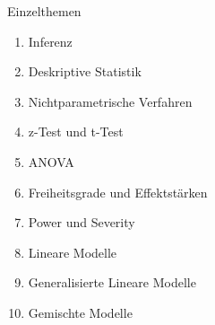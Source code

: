   \begin{frame}
    {Einzelthemen}
    \begin{enumerate}
      \item Inferenz
      \item Deskriptive Statistik
      \item \alert{Nichtparametrische Verfahren}
      \item z-Test und t-Test
      \item ANOVA
      \item Freiheitsgrade und Effektstärken
      \item Power und Severity
      \item Lineare Modelle
      \item Generalisierte Lineare Modelle
      \item Gemischte Modelle
    \end{enumerate}
  \end{frame}
\fi
